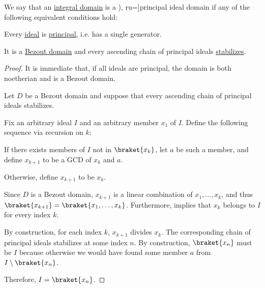 \begin{definition}\label{def:principal_ideal_domain}
  We say that an \hyperref[def:integral_domain]{integral domain} is a \term[bg=област на главни идеали (\cite[def. VI.3]{ГеновМиховскиМоллов1991}), ru=\cite[def. 9.3]{Винберг2014}]{principal ideal domain} if any of the following equivalent conditions hold:
  \begin{thmenum}
     Every \hyperref[def:semiring_ideal]{ideal} is \hyperref[def:semiring_ideal/principal]{principal}, i.e. has a single generator.

     It is a \hyperref[def:bezout_domain]{Bezout domain} and every ascending chain of principal ideals \hyperref[def:stabilizing_chain]{stabilizes}.
  \end{thmenum}
\end{definition}
\begin{proof}
   It is immediate that, if all ideals are principal, the domain is both noetherian and is a Bezout domain.

   Let \( D \) be a Bezout domain and suppose that every ascending chain of principal ideals stabilizes.

  Fix an arbitrary ideal \( I \) and an arbitrary member \( x_1 \) of \( I \). Define the following sequence via recursion on \( k \):
  \begin{displayquote}
    If there exists members of \( I \) not in \( \braket{ x_k } \), let \( a \) be such a member, and define \( x_{k+1} \) to be a GCD of \( x_k \) and \( a \).

    Otherwise, define \( x_{k+1} \) to be \( x_k \).
  \end{displayquote}

  Since \( D \) is a Bezout domain, \( x_{k+1} \) is a linear combination of \( x_1, \ldots, x_k \), and thus \( \braket{ x_{k+1} } = \braket{ x_1, \ldots, x_k } \). Furthermore,  implies that \( x_k \) belongs to \( I \) for every index \( k \).

  By construction, for each index \( k \), \( x_{k+1} \) divides \( x_k \). The corresponding chain of principal ideals stabilizes at some index \( n \). By construction, \( \braket{ x_n } \) must be \( I \) because otherwise we would have found some member \( a \) from \( I \setminus \braket{ x_n } \).

  Therefore, \( I = \braket{ x_n } \).
\end{proof}

